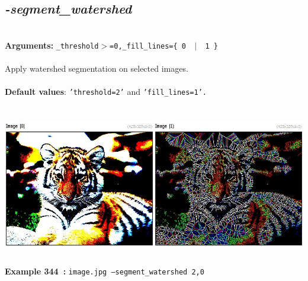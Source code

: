 \documentclass[a4paper,11pt,twoside]{book}
\begin{document}
\subsection{\emph{-segment\_watershed} }\vspace*{-0.5em}
~\\\textbf{Arguments: } 
{\small \texttt{\_threshold$>$=0,\_fill\_lines=\{ 0 ~$|$~ 1 \}}}\\~\\
Apply watershed segmentation on selected images.
~\\~\\\textbf{Default values}: {\small \texttt{'threshold=2'} and \texttt{'fill\_lines=1'.}}
\begin{center}\includegraphics[keepaspectratio=true,height=7cm,width=\textwidth]{img/gmic_def344.jpg}\\
{\footnotesize \textbf{Example 344~:} \texttt{image.jpg --segment\_watershed 2,0}}
\end{center}
\end{document}
